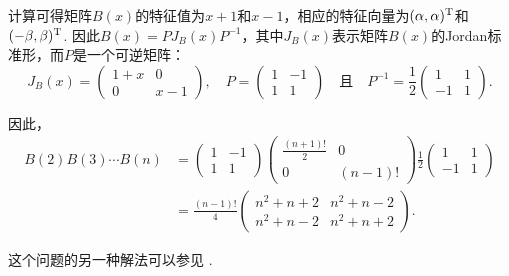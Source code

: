 \begin{solution}
  计算可得矩阵$B(x)$的特征值为$x+1$和$x-1$，相应的特征向量为$(\alpha,\alpha)^{\mathrm T}$和$(-\beta,\beta)^{\mathrm T}$. 因此$B(x)=PJ_B(x)P^{-1}$，其中$J_B(x)$表示矩阵$B(x)$的Jordan标准形，而$P$是一个可逆矩阵：
  \[
    J_B(x) = \begin{pmatrix}
      1 + x & 0 \\
      0 & x - 1
    \end{pmatrix},\quad P = \begin{pmatrix}
      1 & -1 \\
      1 & 1
    \end{pmatrix}\quad \text{且}\quad
    P^{-1} = \frac12 \begin{pmatrix}
      1 & 1 \\
      -1 & 1
    \end{pmatrix}.
  \]

  因此，
  \begin{align*}
    B(2)B(3)\cdots B(n) & = \begin{pmatrix}
      1 & -1 \\
      1 & 1
    \end{pmatrix} \begin{pmatrix}
      \frac{(n+1)!}2 & 0 \\
      0 & (n-1)!
    \end{pmatrix} \frac12 \begin{pmatrix}
      1 & 1 \\
      -1 & 1
    \end{pmatrix} \\
    & = \frac{(n-1)!}4 \begin{pmatrix}
      n^2 + n + 2 & n^2 + n - 2 \\
      n^2 + n - 2 & n^2 + n + 2
    \end{pmatrix}.
  \end{align*}

  这个问题的另一种解法可以参见 \cite{40}.
\end{solution}

